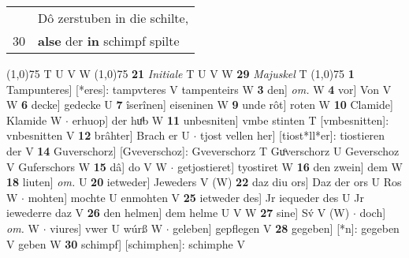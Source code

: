 \documentclass[8pt,a4paper,notitlepage]{article}
\begin{document}
\begin{table}[ht]
\begin{minipage}[t]{0.5\linewidth}
\begin{tabular}{rl}
 & Dô zerstuben in die schilte,\\ 
30 & \textbf{alse} der \textbf{in} schimpf spilte\\ 
\end{tabular}
\scriptsize
\line(1,0){75} \newline
T U V W \newline
\line(1,0){75} \newline
\textbf{21} \textit{Initiale} T U V W  \textbf{29} \textit{Majuskel} T  \newline
\line(1,0){75} \newline
\textbf{1} Tampunteres] [*eres]: tampvteres V tampenteirs W \textbf{3} den] \textit{om.} W \textbf{4} vor] Von V W \textbf{6} decke] gedecke U \textbf{7} îserînen] eiseninen W \textbf{9} unde rôt] roten W \textbf{10} Clamide] Klamide W  $\cdot$ erhuop] der huͦb W \textbf{11} unbesniten] vmbe stinten T [vmbesnitten]: vnbesnitten V \textbf{12} brâhter] Brach er U  $\cdot$ tjost vellen her] [tiost*ll*er]: tiostieren der V \textbf{14} Guverschorz] [Gveverschoz]: Gveverschorz T Guͦverschorz U Geverschoz V Guferschors W \textbf{15} dâ] do V W  $\cdot$ getjostieret] tyostiret W \textbf{16} den zwein] dem W \textbf{18} liuten] \textit{om.} U \textbf{20} ietweder] Jeweders V (W) \textbf{22} daz diu ors] Daz der ors U Ros W  $\cdot$ mohten] mochte U enmohten V \textbf{25} ietweder des] Jr iequeder des U Jr iewederre daz V \textbf{26} den helmen] dem helme U V W \textbf{27} sine] Sv́ V (W)  $\cdot$ doch] \textit{om.} W  $\cdot$ viures] vwer U wúrß W  $\cdot$ geleben] gepflegen V \textbf{28} gegeben] [*n]: gegeben V geben W \textbf{30} schimpf] [schimphen]: schimphe V \newline
\end{minipage}
\end{table}
\end{document}
